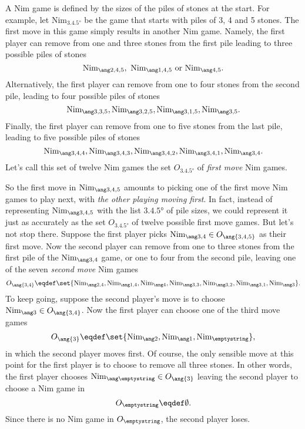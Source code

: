 \begin{definition}
A Nim game is defined by the sizes of the piles of stones at the
start.  For example, let $\text{Nim}_{\ang{3,4,5}}$ be the game that
starts with piles of 3, 4 and 5 stones.  The first move in this game
simply results in another Nim game.  Namely, the first player can
remove from one and three stones from the first pile leading to three
possible piles of stones
\begin{equation}\label{nimplay3}
\nimg{2,4,5},\ \nimg{1,4,5}\ \text{or}\ \nimg{4,5}.
\end{equation}
Alternatively, the first player can remove from one to four stones
from the second pile, leading to four possible piles of stones
\begin{equation}\label{nimplay4}
\nimg{3,3,5},\nimg{3,2,5},\nimg{3,1,5},\nimg{3,5}.
\end{equation}
Finally, the first player  can remove from one to five stones
from the last pile, leading to five possible piles of stones
\begin{equation}\label{nimplay5}
\nimg{3,4,4}, \nimg{3,4,3}, \nimg{3,4,2}, \nimg{3,4,1}, \nimg{3,4}.
\end{equation}
Let's call this set of twelve Nim games the set $O_{\ang{3,4,5}}$ of
\emph{first move} Nim games.

So the first move in $\nimg{3,4,5}$ amounts to picking one of the
first move Nim games to play next, with \emph{the other playing moving
  first}.  In fact, instead of representing $\nimg{3,4,5}$ with the
list $\ang{3,4,5}$ of pile sizes, we could represent it just as
accurately as the set $O_{\ang{3,4,5}}$ of twelve possible first move
games.  But let's not stop there.  Suppose the first player picks
$\nimg{3,4} \in O_{\ang{3,4,5}}$ as their first move.  Now the second
player can remove from one to three stones from the first pile of the
$\nimg{3,4}$ game, or one to four from the second pile, leaving one of
  the seven \emph{second move} Nim games
\[
O_{\ang{3,4}} \eqdef \set{\nimg{2,4}, \nimg{1,4}, \nimg{4}, \nimg{3,3},
  \nimg{3,2}, \nimg{3,1}, \nimg{3}}.
\]
To keep going, suppose the second player's move is to choose $\nimg{3}
\in O_{\ang{3,4}}$.  Now the first player can choose one of the third move games
\[
O_{\ang{3}} \eqdef \set{\nimg{2}, \nimg{1}, \text{Nim}_{\emptystring}},
\]
in which the second player moves first.  Of course, the only sensible
move at this point for the first player is to choose to remove all
three stones.  In other words, the first
player chooses $\nimg{\emptystring} \in O_{\ang{3}}$ leaving the
second player to choose a Nim game in
\[
O_{\emptystring} \eqdef \emptyset.
\]
Since there is no Nim game in $O_{\emptystring}$, the second player
loses.


\end{definition}
